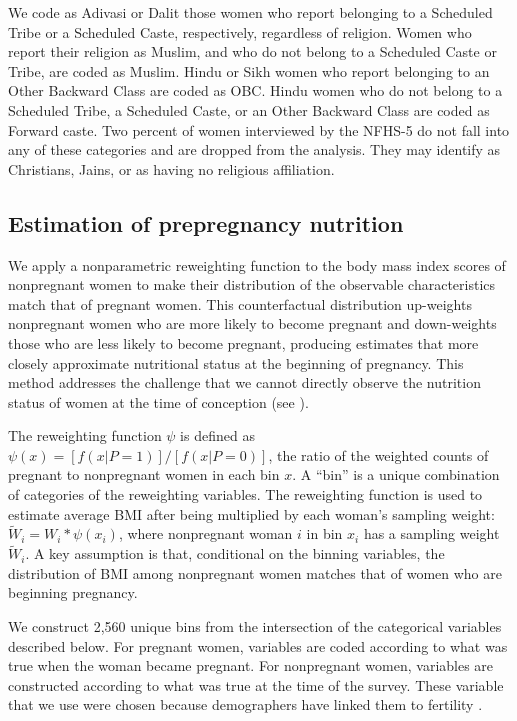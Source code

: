 \documentclass[12pt]{article}
\begin{document}
We code as Adivasi or Dalit those women who report belonging to a Scheduled Tribe or a Scheduled Caste, respectively, regardless of religion.  Women who report their religion as Muslim, and who do not belong to a Scheduled Caste or Tribe, are coded as Muslim. Hindu or Sikh women who report belonging to an Other Backward Class are coded as OBC.  Hindu women who do not belong to a Scheduled Tribe, a Scheduled Caste, or an Other Backward Class are coded as Forward caste.  Two percent of women interviewed by the NFHS-5 do not fall into any of these categories and are dropped from the analysis. They may identify as Christians, Jains, or as having no religious affiliation.

\subsection{Estimation of prepregnancy nutrition}

We apply a nonparametric reweighting function to the body mass index scores of nonpregnant women to make their distribution of the observable characteristics match that of pregnant women. This counterfactual distribution up-weights nonpregnant women who are more likely to become pregnant and down-weights those who are less likely to become pregnant, producing estimates that more closely approximate nutritional status at the beginning of pregnancy. This method addresses the challenge that we cannot directly observe the nutrition status of women at the time of conception (see \cite{coffey2015prepregnancy}). 
 
The reweighting function \(\psi\) is defined as \(\psi(x)=[f(x|P=1)]/[f(x|P=0)]\), the ratio of the weighted counts of pregnant to nonpregnant women in each bin \(x\).  A ``bin'' is a unique combination of categories of the reweighting variables. The reweighting function is used to estimate average BMI after being multiplied by each woman's sampling weight: \(\tilde{W}_i = W_i * \psi(x_i)\), where nonpregnant woman \(i\) in bin \(x_i\) has a sampling weight \(\tilde{W}_i\). A key assumption is that, conditional on the binning variables, the distribution of BMI among nonpregnant women matches that of women who are beginning pregnancy.

We construct 2,560 unique bins from the intersection of the categorical variables described below.  For pregnant women, variables are coded according to what was true when the woman became pregnant.  For nonpregnant women, variables are constructed according to what was true at the time of the survey. These variable that we use were chosen because demographers have linked them to fertility \citep{martin1995women, bongaarts1987proximate, easterlin1971does, bongaarts1984proximate, das1987sex}.
\end{document}
